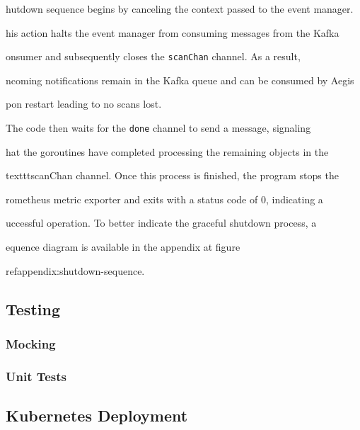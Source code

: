 \documentclass[12pt, conference, final, a4paper, onecolumn, compsoc]{IEEEtran}
\begin{document}
hutdown sequence begins by canceling the context passed to the event manager.

his action halts the event manager from consuming messages from the Kafka

onsumer and subsequently closes the \texttt{scanChan} channel. As a result,

ncoming notifications remain in the Kafka queue and can be consumed by Aegis

pon restart leading to no scans lost.

The code then waits for the \texttt{done} channel to send a message, signaling

hat the goroutines have completed processing the remaining objects in the

texttt{scanChan} channel. Once this process is finished, the program stops the

rometheus metric exporter and exits with a status code of 0, indicating a

uccessful operation. To better indicate the graceful shutdown process, a

equence diagram is available in the appendix at figure

ref{appendix:shutdown-sequence}.

\subsection*{Testing}

\subsubsection*{Mocking}
\paragraph{}

\subsubsection*{Unit Tests}
\paragraph{}

\subsection*{Kubernetes Deployment}
\paragraph{}
\end{document}
